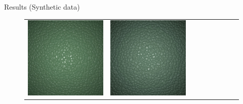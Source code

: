 \documentclass[final]{beamer}
\newlength{\twocolwid}
\newlength{\resultwidth}
\begin{document}
\begin{frame}[t]
\begin{columns}[t]
\begin{column}{\twocolwid}
\begin{block}{Results (Synthetic data)}
\begin{figure}[t]
\begin{tabular}{ccrclcccc}
            		\includegraphics[width=\resultwidth]{images/synth/leather/good3.jpg} &
            		\includegraphics[width=\resultwidth]{images/synth/leather/bad1.jpg}
            		\\

\end{tabular}
\end{figure}
\end{block}
\end{column}
\end{columns}
\end{frame}
\end{document}
